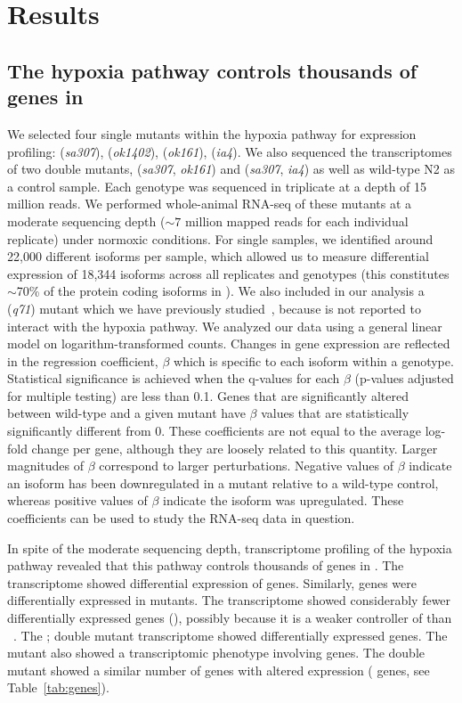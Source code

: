 \section*{Results}
\subsection*{The hypoxia pathway controls thousands of genes in \cel{}}
\label{sub:summary}

We selected four single mutants within the hypoxia pathway for expression profiling:
\egl{} (\emph{sa307}), \rhy{} (\emph{ok1402}), \vhl{} (\emph{ok161}), \hif{} (\emph{ia4}).
We also sequenced the transcriptomes of two double mutants, \eglvhl{} (\emph{sa307},
\emph{ok161}) and \eglhif{} (\emph{sa307}, \emph{ia4}) as well as wild-type N2 as
a control sample. Each genotype  was sequenced in triplicate at a depth of 15
million reads. We performed whole-animal RNA-seq of these mutants at a moderate
sequencing depth ($\sim7$ million mapped reads for each individual replicate)
under normoxic conditions. For single samples, we identified around 22,000 different
isoforms per sample, which allowed us to measure differential expression of 18,344
isoforms across all replicates and genotypes (this constitutes  $\sim$70\% of
the protein coding isoforms in \cel{}).
We also included in our analysis a \fog{} (\emph{q71}) mutant which we have previously
studied~\citep{Angeles-Albores2016a}, because  is not reported to
interact with the hypoxia pathway.
We analyzed our data using a general linear model on
logarithm-transformed counts. Changes in gene expression are reflected in the
regression coefficient, $\beta$ which is specific to each isoform within a genotype.
Statistical significance is achieved when the q-values for each $\beta$ (p-values
adjusted for multiple testing) are less than 0.1. Genes that are significantly
altered between wild-type and a given mutant have $\beta$ values that are
statistically significantly different from 0.  These coefficients are not equal
to the average log-fold change per gene, although they are loosely related to
this quantity. Larger magnitudes of $\beta$ correspond to larger perturbations.
Negative values of $\beta$ indicate an isoform has been downregulated in a
mutant relative to a wild-type control, whereas positive values of $\beta$
indicate the isoform was upregulated.
These coefficients can be used to study the RNA-seq data in question.

In spite of the moderate sequencing depth, transcriptome profiling of the hypoxia
pathway revealed that this pathway controls thousands of genes in \cel{}. The
\egl{} transcriptome showed differential expression of \egln{} genes. Similarly,
\rhyn{} genes were differentially expressed in \rhy{} mutants. The \vhl{}
transcriptome showed considerably fewer differentially expressed genes (\vhln{}),
possibly because it is a weaker controller of \hif{} than
\egl{}~\citep{Shao2009}. The \egl{};\vhl{} double mutant transcriptome showed
\eglvhln{} differentially expressed genes. The \hif{} mutant also showed a
transcriptomic phenotype involving \hifn{} genes. The \eglhif{} double mutant
showed a similar number of genes with altered expression (\eglhifn{} genes, see
Table~\ref{tab:genes}).

